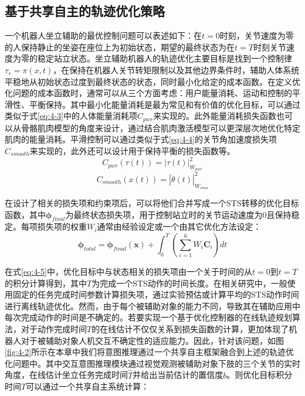 \subsection{基于共享自主的轨迹优化策略}
一个机器人坐立辅助的最优控制问题可以表述如下：在$t=0$时刻，关节速度为零的人保持静止的坐姿在座位上为初始状态，期望的最终状态为在$t=T$时刻关节速度为零的稳定站立状态。坐立辅助机器人的轨迹优化主要目标是找到一个控制律$τ_∗= π(x,t)$，在保持在机器人关节转矩限制以及其他边界条件时，辅助人体系统平稳地从初始状态过度到最终状态的状态，同时最小化给定的成本函数。在定义优化问题的成本函数时，通常可以从三个方面考虑：用户能量消耗、运动和控制的平滑性、平衡保持。其中最小化能量消耗是最为常见和有价值的优化目标，可以通过类似于式\ref{eq:4-3}中的人体能量消耗项$C_{pwr}$来实现的。此外能量消耗损失函数也可以从骨骼肌肉模型的角度来设计，通过结合肌肉激活模型可以更深层次地优化特定肌肉的能量消耗\cite{kumarPredictingSittoStandAdaptations2022}。平滑控制可以通过类似于式\ref{eq:4-4}的关节角加速度损失项$C_{smooth}$来实现的，此外还可以设计用于保持平衡的损失函数等。
\begin{equation}
    C_{pwr}(\tau(t))=|\tau(t)|_{W_{pwr}}^2
    \label{eq:4-3}
\end{equation}
\begin{equation}
    C_{smooth}(x(t))=|\dddot{\theta}(t)|_{W_{smo}}^2
    \label{eq:4-4}
\end{equation}

在设计了相关的损失项和约束项后，可以将他们合并写成一个STS转移的优化目标函数，其中$\boldsymbol{\phi}_{final}$为最终状态损失项，用于控制站立时的关节运动速度为0且保持稳定。每项损失项的权重$W_i$通常由经验设定或一个由其它优化方法设定：
\begin{equation}
    \boldsymbol{\phi}_{total}=\boldsymbol{\phi}_{final}(\boldsymbol{x})+\int_0^T\left(\sum_{i=1}^6 W_i \boldsymbol{C}_i\right) dt
    \label{eq:4-5}
\end{equation}

在式\ref{eq:4-5}中，优化目标中与状态相关的损失项由一个关于时间的从$t=0$到$t=T$的积分计算得到，其中$T$为完成一个STS动作的时间长度。在相关研究中，一般使用固定的任务完成时间参数计算损失项，通过实验预估或计算平均的STS动作时间进行离线轨迹优化。然而，由于每个被辅助对象的能力不同，导致其在辅助应用中每次完成动作的时间是不确定的。若要实现一个基于优化控制器的在线轨迹规划算法，对于动作完成时间$T$的在线估计不仅仅关系到损失函数的计算，更加体现了机器人对于被辅助对象人机交互不确定性的适应能力。因此，针对该问题，如图\ref{fig:4-2}所示在本章中我们将意图推理通过一个共享自主框架融合到上述的轨迹优化问题中。其中交互意图推理模块通过视觉观测被辅助对象下肢的三个关节的实时角度，在线估计坐立任务完成时间$\hat T$并给出当前估计的置信度$b$。则优化目标积分时间$T$可以通过一个共享自主系统计算：


